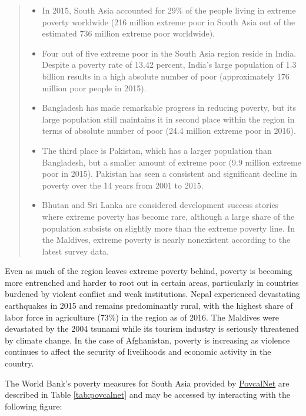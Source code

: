 \documentclass[13 pt,]{book}
\providecommand{\tightlist}{%
  \setlength{\itemsep}{0pt}\setlength{\parskip}{0pt}}
\begin{document}
\begin{quote}
\begin{itemize}
\tightlist
\item
  In 2015, South Asia accounted for 29\% of the people living in extreme
  poverty worldwide (216 million extreme poor in South Asia out of the
  estimated 736 million extreme poor worldwide).
\item
  Four out of five extreme poor in the South Asia region reside in
  India. Despite a poverty rate of 13.42 percent, India's large
  population of 1.3 billion results in a high absolute number of poor
  (approximately 176 million poor people in 2015).
\item
  Bangladesh has made remarkable progress in reducing poverty, but its
  large population still maintains it in second place within the region
  in terms of absolute number of poor (24.4 million extreme poor in
  2016).
\item
  The third place is Pakistan, which has a larger population than
  Bangladesh, but a smaller amount of extreme poor (9.9 million extreme
  poor in 2015). Pakistan has seen a consistent and significant decline
  in poverty over the 14 years from 2001 to 2015.
\item
  Bhutan and Sri Lanka are considered development success stories where
  extreme poverty has become rare, although a large share of the
  population subsists on slightly more than the extreme poverty line. In
  the Maldives, extreme poverty is nearly nonexistent according to the
  latest survey data.
\end{itemize}
\end{quote}

Even as much of the region leaves extreme poverty behind, poverty is
becoming more entrenched and harder to root out in certain areas,
particularly in countries burdened by violent conflict and weak
institutions. Nepal experienced devastating earthquakes in 2015 and
remains predominantly rural, with the highest share of labor force in
agriculture (73\%) in the region as of 2016. The Maldives were
devastated by the 2004 tsunami while its tourism industry is seriously
threatened by climate change. In the case of Afghanistan, poverty is
increasing as violence continues to affect the security of livelihoods
and economic activity in the country.

The World Bank's poverty measures for South Asia provided by
\href{http://iresearch.worldbank.org/PovcalNet/home.aspx}{PovcalNet} are
described in Table \ref{tab:povcalnet} and may be accessed by
interacting with the following figure:
\end{document}
